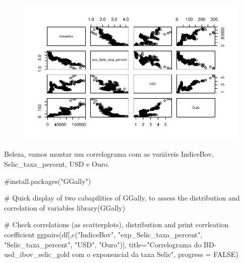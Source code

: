 \documentclass[
  letterpaper,
  DIV=11,
  numbers=noendperiod]{scrartcl}
\newenvironment{Shaded}{\begin{snugshade}}{\end{snugshade}}
\newcommand{\AttributeTok}[1]{\textcolor[rgb]{0.40,0.45,0.13}{#1}}
\newcommand{\CommentTok}[1]{\textcolor[rgb]{0.37,0.37,0.37}{#1}}
\newcommand{\ConstantTok}[1]{\textcolor[rgb]{0.56,0.35,0.01}{#1}}
\newcommand{\FunctionTok}[1]{\textcolor[rgb]{0.28,0.35,0.67}{#1}}
\newcommand{\NormalTok}[1]{\textcolor[rgb]{0.00,0.23,0.31}{#1}}
\newcommand{\StringTok}[1]{\textcolor[rgb]{0.13,0.47,0.30}{#1}}
\begin{document}
\begin{figure}[H]

{\centering \includegraphics{DemonstracaoStrucchange_files/figure-pdf/unnamed-chunk-6-1.pdf}

}

\end{figure}

Beleza, vamos montar um correlograma com as variáveis IndiceBov,
Selic\_taxa\_percent, USD e Ouro.

\begin{Shaded}
\begin{Highlighting}[]
\CommentTok{\#install.packages("GGally")}

\CommentTok{\# Quick display of two cabapilities of GGally, to assess the distribution and correlation of variables }
\FunctionTok{library}\NormalTok{(GGally)}

 
\CommentTok{\# Check correlations (as scatterplots), distribution and print corrleation coefficient }
\FunctionTok{ggpairs}\NormalTok{(df[,}\FunctionTok{c}\NormalTok{(}\StringTok{"IndiceBov"}\NormalTok{,}
              \StringTok{"exp\_Selic\_taxa\_percent"}\NormalTok{,}
              \StringTok{"Selic\_taxa\_percent"}\NormalTok{,}
              \StringTok{"USD"}\NormalTok{,}
              \StringTok{"Ouro"}\NormalTok{)],}
        \AttributeTok{title=}\StringTok{"Correlograma do BD{-}usd\_ibov\_selic\_gold com o exponencial da taxa Selic"}\NormalTok{,}
        \AttributeTok{progress =} \ConstantTok{FALSE}\NormalTok{) }
\end{Highlighting}
\end{Shaded}
\end{document}
